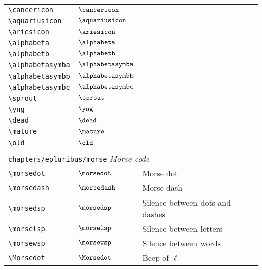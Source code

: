 \begin{longtable}{lll}
 \hline
{\color[rgb]{0.5,0.5,0.5}\texttt{\textbackslash cancericon}} & $\cancericon$ & \\ 
 {\color[rgb]{0.5,0.5,0.5}\texttt{\textbackslash aquariusicon}} & $\aquariusicon$ & \\ 
 {\color[rgb]{0.5,0.5,0.5}\texttt{\textbackslash ariesicon}} & $\ariesicon$ & \\ 
 {\color[rgb]{0.5,0.5,0.5}\texttt{\textbackslash alphabeta}} & $\alphabeta$ & \\ 
 {\color[rgb]{0.5,0.5,0.5}\texttt{\textbackslash alphabetb}} & $\alphabetb$ & \\ 
 {\color[rgb]{0.5,0.5,0.5}\texttt{\textbackslash alphabetasymba}} & $\alphabetasymba$ & \\ 
 {\color[rgb]{0.5,0.5,0.5}\texttt{\textbackslash alphabetasymbb}} & $\alphabetasymbb$ & \\ 
 {\color[rgb]{0.5,0.5,0.5}\texttt{\textbackslash alphabetasymbc}} & $\alphabetasymbc$ & \\ 
 {\color[rgb]{0.5,0.5,0.5}\texttt{\textbackslash sprout}} & $\sprout$ & \\ 
 {\color[rgb]{0.5,0.5,0.5}\texttt{\textbackslash yng}} & $\yng$ & \\ 
 {\color[rgb]{0.5,0.5,0.5}\texttt{\textbackslash dead}} & $\dead$ & \\ 
 {\color[rgb]{0.5,0.5,0.5}\texttt{\textbackslash mature}} & $\mature$ & \\ 
 {\color[rgb]{0.5,0.5,0.5}\texttt{\textbackslash old}} & $\old$ & \\ 
  &  & \\ 
 \multicolumn{3}{l}{{\color[rgb]{0.5,0.5,0.5}\texttt{chapters/epluribus/morse}} \emph{Morse code}}\\ 
 \hline
{\color[rgb]{0.5,0.5,0.5}\texttt{\textbackslash morsedot}} & $\morsedot$ &  Morse dot\\ 
 {\color[rgb]{0.5,0.5,0.5}\texttt{\textbackslash morsedash}} & $\morsedash$ &  Morse dash\\ 
 {\color[rgb]{0.5,0.5,0.5}\texttt{\textbackslash morsedsp}} & $\morsedsp$ &  Silence between dots and dashes\\ 
 {\color[rgb]{0.5,0.5,0.5}\texttt{\textbackslash morselsp}} & $\morselsp$ &  Silence between letters\\ 
 {\color[rgb]{0.5,0.5,0.5}\texttt{\textbackslash morsewsp}} & $\morsewsp$ &  Silence between words\\ 
 {\color[rgb]{0.5,0.5,0.5}\texttt{\textbackslash Morsedot}} & $\Morsedot$ &  Beep of $\ell$\\ 

\end{longtable}
